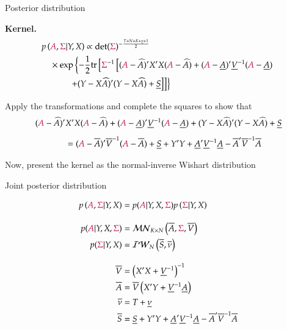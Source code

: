 \documentclass[notes,blackandwhite,mathsans,usenames,dvipsnames]{beamer}
\begin{document}
\begin{frame}{Posterior distribution}

\textbf{Kernel.}
\begin{align*} 
&p\left( {\color{purple}A},{\color{purple}\Sigma} |Y,X\right) \propto\text{det}({\color{purple}\Sigma})^{-\frac{T+N+K+\underline{\nu}+1}{2}}\\
&\quad\times\exp\left\{ -\frac{1}{2}\text{tr}\left[ {\color{purple}\Sigma}^{-1}\left[({\color{purple}A}-\widehat{A})'X'X({\color{purple}A}-\widehat{A}) + ({\color{purple}A}-\underline{A})'\underline{V}^{-1}({\color{purple}A}-\underline{A}) \right.\right.\right.\\
&\qquad\quad \left.\left.\left. +(Y-X\widehat{A})'(Y-X\widehat{A}) + \underline{S} \right]\right] \right\}
\end{align*} 

{\color{mcxs2}Apply the transformations and complete the squares to show that}\small
\begin{align*} 
({\color{purple}A}-\widehat{A})'&X'X({\color{purple}A}-\widehat{A}) + ({\color{purple}A}-\underline{A})'\underline{V}^{-1}({\color{purple}A}-\underline{A})  +(Y-X\widehat{A})'(Y-X\widehat{A}) + \underline{S}\\[1ex]
&= ({\color{purple}A}-\overline{A})'\overline{V}^{-1}({\color{purple}A}-\overline{A}) +
\underline{S}+Y'Y + \underline{A}'\underline{V}^{-1}\underline{A} - \overline{A}'\overline{V}^{-1}\overline{A}
\end{align*} 

\normalsize{\color{mcxs2}Now, present the kernel as the normal-inverse Wishart distribution}
\end{frame}



\begin{frame}{Joint posterior distribution}

\begin{align*} 
p\left( {\color{purple}A}, {\color{purple}\Sigma}|Y,X \right) &= p({\color{purple}A}|Y,X,{\color{purple}\Sigma})p\left( {\color{purple}\Sigma}|Y,X \right)\\[2ex]
p({\color{purple}A}|Y,X,{\color{purple}\Sigma}) &= \mathcal{MN}_{K\times N}\left( \overline{A},{\color{purple}\Sigma},\overline{V} \right)\\
p({\color{purple}\Sigma}|Y,X) &= \mathcal{IW}_N\left( \overline{S}, \overline{\nu} \right)\\[2ex]
\overline{V}&= \left( X'X + \underline{V}^{-1}\right)^{-1} \\
\overline{A}&= \overline{V}\left( X'Y + \underline{V}^{-1}\underline{A} \right)\\
\overline{\nu}&= T+\underline{\nu}\\
\overline{S}&= \underline{S}+Y'Y + \underline{A}'\underline{V}^{-1}\underline{A} - \overline{A}'\overline{V}^{-1}\overline{A}
\end{align*} 


\end{frame}
\end{document}
